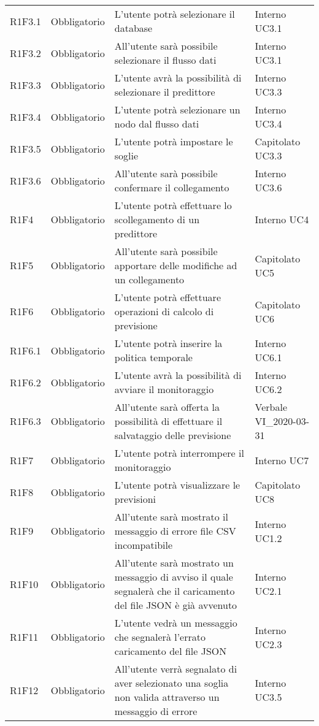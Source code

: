 \begin{longtable}{C{3cm} C{3cm} L{5.5cm} C{3cm}}
R1F3.1 & Obbligatorio & L’utente potrà selezionare il database &  Interno UC3.1\\
R1F3.2 & Obbligatorio & All’utente sarà possibile selezionare il flusso dati &  Interno UC3.1\\
R1F3.3 & Obbligatorio & L’utente avrà la possibilità di selezionare il predittore  &  Interno UC3.3\\
R1F3.4 & Obbligatorio & L’utente potrà selezionare un nodo dal flusso dati &  Interno UC3.4\\
R1F3.5 & Obbligatorio & L’utente potrà impostare le soglie &  Capitolato UC3.3\\
R1F3.6 & Obbligatorio & All’utente sarà possibile confermare il collegamento &  Interno UC3.6\\
R1F4 & Obbligatorio & L’utente potrà effettuare lo scollegamento di un predittore &  Interno UC4\\
R1F5 & Obbligatorio & All’utente sarà possibile apportare delle modifiche ad un collegamento & Capitolato UC5\\
R1F6 & Obbligatorio & L’utente potrà effettuare operazioni di calcolo di previsione &  Capitolato UC6\\
R1F6.1 & Obbligatorio & L’utente potrà inserire la politica temporale &  Interno UC6.1\\
R1F6.2 & Obbligatorio & L’utente avrà la possibilità di avviare il monitoraggio &  Interno UC6.2\\
R1F6.3 & Obbligatorio & All’utente sarà offerta la possibilità di effettuare il salvataggio delle previsione &  Verbale VI\_2020-03-31\\
R1F7 & Obbligatorio & L’utente potrà interrompere il monitoraggio & Interno UC7\\
R1F8 & Obbligatorio & L’utente potrà visualizzare le previsioni &  Capitolato UC8\\
R1F9 & Obbligatorio & All’utente sarà mostrato il messaggio di errore file CSV incompatibile &  Interno UC1.2\\
R1F10 & Obbligatorio & All’utente sarà mostrato un messaggio di avviso il quale segnalerà che il caricamento del file JSON è già avvenuto &  Interno UC2.1\\
R1F11 & Obbligatorio & L’utente vedrà un messaggio che segnalerà l’errato caricamento del file JSON &  Interno UC2.3\\
R1F12 & Obbligatorio & All’utente verrà segnalato di aver selezionato una soglia non valida attraverso un messaggio di errore &  Interno
UC3.5\\

\end{longtable}
